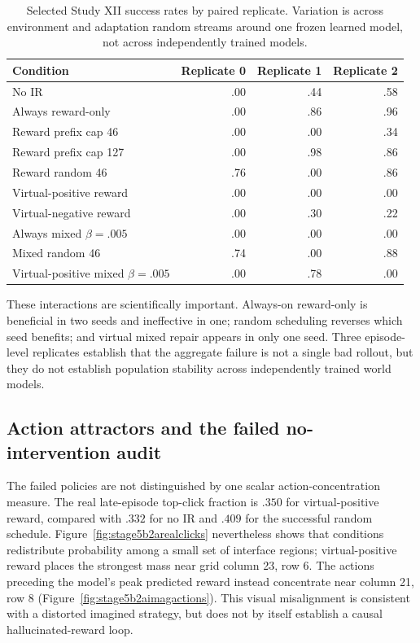 \documentclass[10pt]{article}
\begin{document}
\begin{table}[H]
\centering
\small
\caption{Selected Study XII success rates by paired replicate. Variation is across environment and adaptation random streams around one frozen learned model, not across independently trained models.}
\label{tab:stage5b2areps}
\begin{tabular}{lrrr}
\toprule
Condition & Replicate 0 & Replicate 1 & Replicate 2 \\
\midrule
No IR & .00 & .44 & .58 \\
Always reward-only & .00 & .86 & .96 \\
Reward prefix cap 46 & .00 & .00 & .34 \\
Reward prefix cap 127 & .00 & .98 & .86 \\
Reward random 46 & .76 & .00 & .86 \\
Virtual-positive reward & .00 & .00 & .00 \\
Virtual-negative reward & .00 & .30 & .22 \\
Always mixed $\beta=.005$ & .00 & .00 & .00 \\
Mixed random 46 & .74 & .00 & .88 \\
Virtual-positive mixed $\beta=.005$ & .00 & .78 & .00 \\
\bottomrule
\end{tabular}
\end{table}

These interactions are scientifically important. Always-on reward-only is
beneficial in two seeds and ineffective in one; random scheduling reverses
which seed benefits; and virtual mixed repair appears in only one seed. Three
episode-level replicates establish that the aggregate failure is not a single
bad rollout, but they do not establish population stability across independently
trained world models.

\subsection{Action attractors and the failed no-intervention audit}

The failed policies are not distinguished by one scalar action-concentration
measure. The real late-episode top-click fraction is $.350$ for virtual-positive
reward, compared with $.332$ for no IR and $.409$ for the successful random
schedule. Figure~\ref{fig:stage5b2arealclicks} nevertheless shows that
conditions redistribute probability among a small set of interface regions;
virtual-positive reward places the strongest mass near grid column 23, row 6.
The actions preceding the model's peak predicted reward instead concentrate
near column 21, row 8 (Figure~\ref{fig:stage5b2aimagactions}). This visual
misalignment is consistent with a distorted imagined strategy, but does not
by itself establish a causal hallucinated-reward loop.
\end{document}
